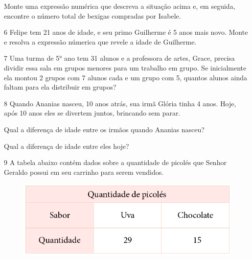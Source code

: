 Monte uma expressão numérica que descreva a situação acima 
e, em seguida, encontre o número total de bexigas compradas por Isabele.

\bigskip
\bigskip
\bigskip
\bigskip
\bigskip
\bigskip
\bigskip

\num{6} Felipe tem 21 anos de idade, e seu primo Guilherme é 5 anos mais
novo. Monte e resolva a expressão númerica que revele a
idade de Guilherme.

\bigskip
\bigskip
\bigskip
\bigskip
\pagebreak

\num{7} Uma turma de 5° ano tem 31 alunos e a professora de artes, Grace,
precisa dividir essa sala em grupos menores para um trabalho em grupo.
Se inicialmente ela montou 2 grupos com 7 alunos cada e um grupo com 5,
quantos alunos ainda faltam para ela distribuir em grupos?

\bigskip
\bigskip
\bigskip
\bigskip
\bigskip

\num{8} Quando Ananias nasceu, 10 anos atrás, sua irmã Glória tinha 4 
anos. Hoje, após 10 anos eles se divertem juntos, brincando sem parar.

\begin{escolha}
\item
  Qual a diferença de idade entre os irmãos quando Ananias nasceu?

\bigskip
\bigskip
\bigskip
\bigskip

\item
  Qual a diferença de idade entre eles hoje?

\end{escolha}


\num{9} A tabela abaixo contém dados sobre a quantidade de picolés que
Senhor Geraldo possui em seu carrinho para serem vendidos.

\begin{figure}[htpb!]
\centering
\includegraphics[width=.7\textwidth]{../ilustracoes/MAT5/SAEB_5ANO_MAT_figura92.png}
\end{figure}

